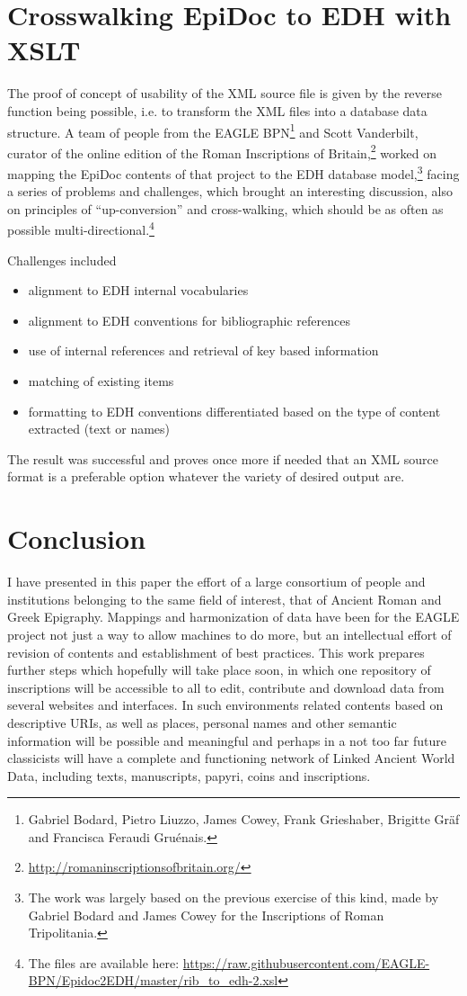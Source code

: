 \documentclass[amsthm,ebook]{saparticle}
\begin{document}
\section{Crosswalking EpiDoc to EDH with XSLT}
\noindent The proof of concept of usability of the XML source file is given by the reverse function being possible, i.e. to transform the XML files into a database data structure. A team of people from the EAGLE BPN\footnote{Gabriel Bodard, Pietro Liuzzo, James Cowey, Frank Grieshaber, Brigitte Gräf and Francisca Feraudi Gruénais.} and Scott Vanderbilt, curator of the online edition of the Roman Inscriptions of Britain,\footnote{\url{http://romaninscriptionsofbritain.org/}} worked on mapping the EpiDoc contents of that project to the EDH database model,\footnote{The work was largely based on the previous exercise of this kind, made by Gabriel Bodard and James Cowey for the Inscriptions of Roman Tripolitania.} facing a series of problems and challenges, which brought an interesting discussion, also on principles of ``up-conversion'' and cross-walking, which should be as often as possible multi-directional.\footnote{The files are available here: \url{https://raw.githubusercontent.com/EAGLE-BPN/Epidoc2EDH/master/rib_to_edh-2.xsl}}

Challenges included
\begin{itemize}
\item alignment to EDH internal vocabularies
\item alignment to EDH conventions for bibliographic references
\item use of internal references and retrieval of key based information
\item matching of existing items
\item formatting to EDH conventions differentiated based on the type of content extracted (text or names) 
\end{itemize}

The result was successful and proves once more if needed that an XML source format is a preferable option whatever the variety of desired output are.

\section{Conclusion}
\noindent I have presented in this paper the effort of a large consortium of people and institutions belonging to the same field of interest, that of Ancient Roman and Greek Epigraphy.
Mappings and harmonization of data have been for the EAGLE project not just a way to allow machines to do more, but an intellectual effort of revision of contents and establishment of best practices. This work prepares further steps which hopefully will take place soon, in which one repository of inscriptions will be accessible to all to edit, contribute and download data from several websites and interfaces. In such environments related contents based on descriptive URIs, as well as places, personal names and other semantic information will be possible and meaningful and perhaps in a not too far future classicists will have a complete and functioning network of Linked Ancient World Data, including texts, manuscripts, papyri, coins and inscriptions. 



\end{document}
